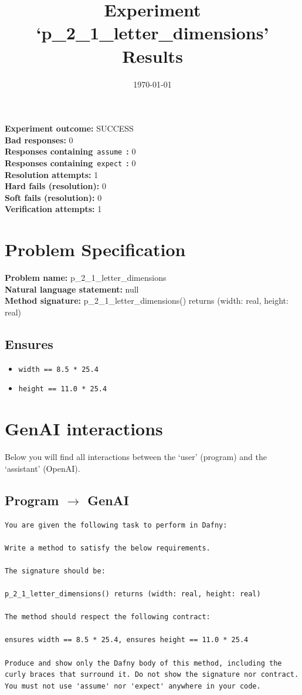 \documentclass{article}
\begin{document}
\title{Experiment `p\_2\_1\_letter\_dimensions' Results}
\author{\today}
\date{}
\maketitle
\textbf{Experiment outcome: }SUCCESS
\\\textbf{Bad responses: }0
\\\textbf{Responses containing}~\texttt{assume}~\textbf{: }0
\\\textbf{Responses containing}~\texttt{expect}~\textbf{: }0
\\\textbf{Resolution attempts: }1
\\\textbf{Hard fails (resolution): }0
\\\textbf{Soft fails (resolution): }0
\\\textbf{Verification attempts: }1
\section*{Problem Specification}
\textbf{Problem name: }p\_2\_1\_letter\_dimensions
\\\textbf{Natural language statement: }null
\\\textbf{Method signature: }p\_2\_1\_letter\_dimensions() returns (width: real, height: real)
\subsection*{Ensures}
\begin{itemize}
\item \texttt{width == 8.5 * 25.4}
\item \texttt{height == 11.0 * 25.4}
\end{itemize}
\clearpage
\section*{GenAI interactions}
Below you will find all interactions between the `user' (program) and the `assistant' (OpenAI).
\subsection*{Program $\rightarrow$ GenAI}
\begin{lstlisting}
You are given the following task to perform in Dafny:

Write a method to satisfy the below requirements.

The signature should be:

p_2_1_letter_dimensions() returns (width: real, height: real)

The method should respect the following contract:

ensures width == 8.5 * 25.4, ensures height == 11.0 * 25.4

Produce and show only the Dafny body of this method, including the curly braces that surround it. Do not show the signature nor contract. You must not use 'assume' nor 'expect' anywhere in your code.
\end{lstlisting}
\end{document}
